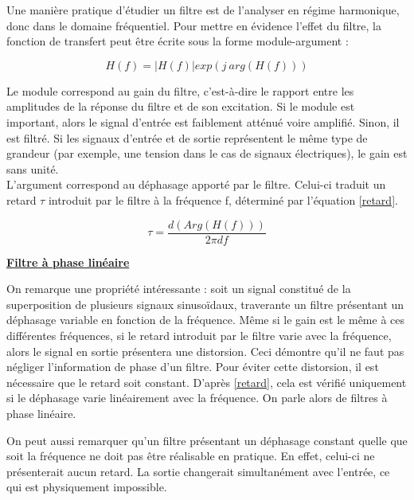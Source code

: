 	Une manière pratique d'étudier un filtre est de l'analyser en régime harmonique, donc dans le domaine fréquentiel. Pour mettre en évidence l'effet du filtre, la fonction de transfert peut être écrite sous la forme module-argument :
	
	\begin{equation}\label{key}
	H(f) = |H(f)|exp(j~arg(H(f)))
	\end{equation}
	
	 Le module correspond au gain du filtre, c'est-à-dire le rapport entre les amplitudes de la réponse du filtre et de son excitation. Si le module est important, alors le signal d'entrée est faiblement atténué voire amplifié. Sinon, il est filtré.
	Si les signaux d'entrée et de sortie représentent le même type de grandeur (par exemple, une tension dans le cas de signaux électriques), le gain est sans unité.\\ 
	
	L'argument correspond au déphasage apporté par le filtre. Celui-ci traduit un retard $ \tau $ introduit par le filtre à la fréquence f, déterminé par l'équation \ref{retard}.	
	
	\begin{equation}\label{retard}
	\tau = \frac{d(Arg(H(f)))}{2\pi df}
	\end{equation}
	
	\vspace{1\baselineskip}
	
	\underline{\textbf{Filtre à phase linéaire}}
	
	On remarque une propriété intéressante : soit un signal constitué de la superposition de plusieurs signaux sinusoïdaux, traverante un filtre présentant un déphasage variable en fonction de la fréquence. Même si le gain est le même à ces différentes fréquences, si le retard introduit par le filtre varie avec la fréquence, alors le signal en sortie présentera une distorsion. Ceci démontre qu'il ne faut pas négliger l'information de phase d'un filtre.
	Pour éviter cette distorsion, il est nécessaire que le retard soit constant. D'après \ref{retard}, cela est vérifié uniquement si le déphasage varie linéairement avec la fréquence. On parle alors de filtres à phase linéaire.
	
	On peut aussi remarquer qu'un filtre présentant un déphasage constant quelle que soit la fréquence ne doit pas être réalisable en pratique. En effet, celui-ci ne présenterait aucun retard. La sortie changerait simultanément avec l'entrée, ce qui est physiquement impossible.
	
